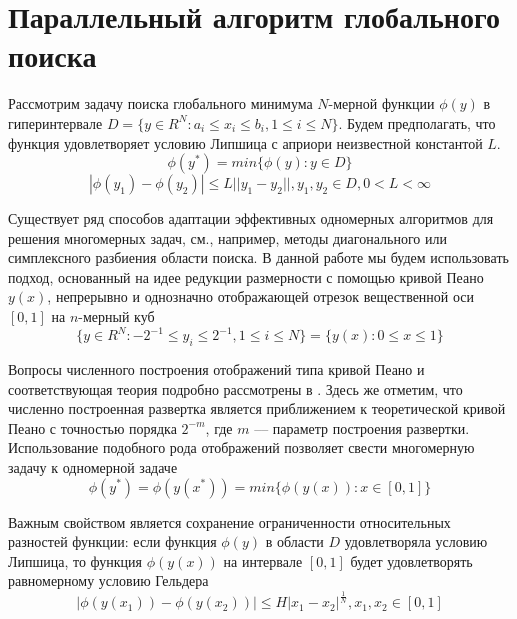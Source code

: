 \section{Параллельный алгоритм глобального поиска}
Рассмотрим задачу поиска глобального минимума \(N\)-мерной функции \(\phi(y)\) в гиперинтервале \(D=\{y\in R^N:a_i\leqslant x_i\leqslant{b_i}, 1\leqslant{i}\leqslant{N}\}\). Будем предполагать, что функция удовлетворяет условию Липшица с априори неизвестной константой \(L\).
\begin{equation}
\label{task}
\phi(y^*)=min\{\phi(y):y\in D\}
\end{equation}
\begin{equation}
\label{lip}
|\phi(y_1)-\phi(y_2)|\leqslant L||y_1-y_2||,y_1,y_2\in D,0<L<\infty
\end{equation}
\par
Существует ряд способов адаптации эффективных одномерных алгоритмов для решения многомерных задач, см., например, методы диагонального \cite{sergKvaDiaPaper} или симплексного \cite{zilinsk} разбиения области поиска. В данной работе мы будем использовать подход, основанный на идее редукции размерности с помощью кривой Пеано \(y(x)\), непрерывно и однозначно отображающей отрезок вещественной оси \([0,1]\) на \(n\)-мерный куб 
\begin{equation}
\label{cube}
\{y\in R^N:-2^{-1}\leqslant y_i\leqslant 2^{-1},1\leqslant i\leqslant N\}=\{y(x):0\leqslant x\leqslant 1\}
\end{equation}
\par
Вопросы численного построения отображений типа кривой Пеано и соответствующая теория подробно рассмотрены в \cite{strSergOptBook}. Здесь же отметим, что численно построенная развертка является приближением к теоретической кривой Пеано с точностью порядка \(2^{-m}\), где \(m\) –-- параметр построения развертки. Использование подобного рода отображений позволяет свести многомерную задачу к одномерной задаче
\begin{equation}
\label{oneDimTask}
\phi(y^*)=\phi(y(x^*))=min\{\phi(y(x)):x\in [0,1]\}
\end{equation}
\par
Важным свойством является сохранение ограниченности относительных разностей функции: если функция \(\phi(y)\) в области \(D
\) удовлетворяла условию Липшица, то функция \(\phi(y(x))\) на интервале \([0,1]\) будет удовлетворять равномерному условию Гельдера
\begin{equation}
\label{holder}
|\phi(y(x_1))-\phi(y(x_2))|\leqslant H{|x_1-x_2|}^{\frac{1}{N}},x_1,x_2\in[0,1]
\end{equation}
